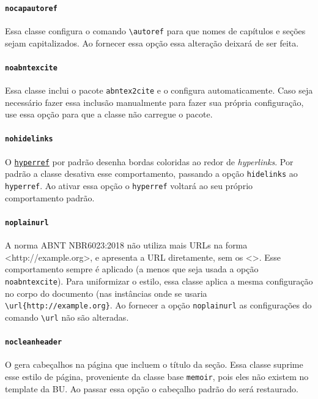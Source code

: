 \documentclass[embeddedlogo]{../ufsc-thesis-rn46-2019}
\newcommand{\lacmd}[1]{\texttt{\textbackslash{}#1}}
\begin{document}
\paragraph*{\texttt{nocapautoref}} Essa classe configura o comando
\lacmd{autoref} para que nomes de capítulos e seções sejam capitalizados. Ao
fornecer essa opção essa alteração deixará de ser feita.

\paragraph*{\texttt{noabntexcite}} Essa classe inclui o pacote
\texttt{abntex2cite} e o configura automaticamente. Caso seja necessário fazer
essa inclusão manualmente para fazer sua própria configuração, use essa opção
para que a classe não carregue o pacote.

\paragraph*{\texttt{nohidelinks}} O
\href{https://ctan.org/pkg/hyperref}{\texttt{hyperref}} por padrão desenha
bordas coloridas ao redor de \emph{hyperlinks}. Por padrão a classe desativa
esse comportamento, passando a opção \texttt{hidelinks} ao \texttt{hyperref}.
Ao ativar essa opção o \texttt{hyperref} voltará ao seu próprio comportamento
padrão.

\paragraph*{\texttt{noplainurl}} A norma ABNT NBR6023:2018 não utiliza mais URLs
na forma <http://example.org>, e apresenta a URL diretamente, sem os <>.  Esse
comportamento sempre é aplicado (a menos que seja usada a opção
\texttt{noabntexcite}). Para uniformizar o estilo, essa classe aplica a mesma
configuração no corpo do documento (nas instâncias onde se usaria
\lacmd{url\{http://example.org\}}. Ao fornecer a opção \texttt{noplainurl} as
configurações do comando \lacmd{url} não são alteradas.


\paragraph*{\texttt{nocleanheader}} O \abnTeX{} gera cabeçalhos na página que
incluem o título da seção. Essa classe suprime esse estilo de página,
proveniente da classe base \texttt{memoir}, pois eles não existem no template
da BU. Ao passar essa opção o cabeçalho padrão do \abnTeX{} será restaurado.
\end{document}
